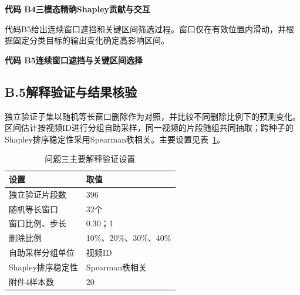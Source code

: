 \noindent\textbf{代码 B4\quad 三模态精确Shapley贡献与交互}


代码B5给出连续窗口遮挡和关键区间筛选过程。窗口仅在有效位置内滑动，并根据固定分类目标的输出变化确定高影响区间。

\noindent\textbf{代码 B5\quad 连续窗口遮挡与关键区间选择}


\subsection*{B.5\quad 解释验证与结果核验}
独立验证子集以随机等长窗口删除作为对照，并比较不同删除比例下的预测变化。区间估计按视频ID进行分组自助采样，同一视频的片段随组共同抽取；跨种子的Shapley排序稳定性采用Spearman秩相关。主要设置见表~\ref{tab:app_b_checks}。

\begin{table}[H]
\centering\normalsize
\caption{问题三主要解释验证设置}\label{tab:app_b_checks}
\begin{tabular}{@{}ll@{}}
\toprule 设置 & 取值\\\midrule
独立验证片段数 & 396\\
随机等长窗口 & 32个\\
窗口比例、步长 & 0.30；1\\
删除比例 & 10\%、20\%、30\%、40\%\\
自助采样分组单位 & 视频ID\\
Shapley排序稳定性 & Spearman秩相关\\
附件4样本数 & 20\\
\bottomrule\end{tabular}\end{table}
\endgroup
